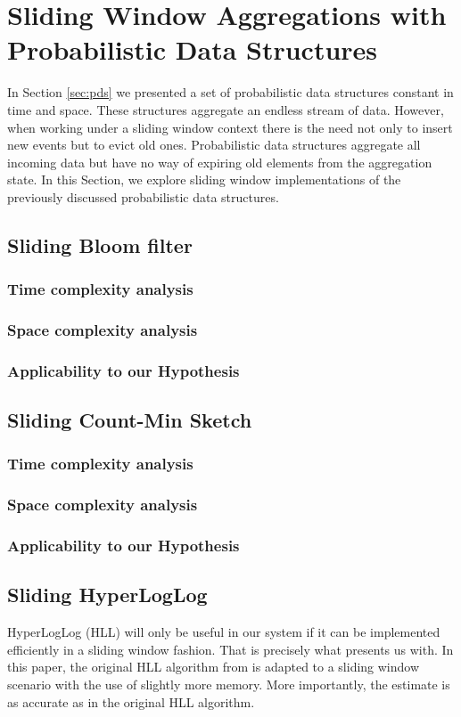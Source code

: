 \section{Sliding Window Aggregations with Probabilistic Data Structures}
In Section \ref{sec:pds} we presented a set of probabilistic data structures constant in time and space. These structures aggregate an endless stream of data. However, when working under a sliding window context there is the need not only to insert new events but to evict old ones. Probabilistic data structures aggregate all incoming data but have no way of expiring old elements from the aggregation state. In this Section, we explore sliding window implementations of the previously discussed probabilistic data structures.


\subsection{Sliding Bloom filter}
\subsubsection*{Time complexity analysis}
\subsubsection*{Space complexity analysis}
\subsubsection*{Applicability to our Hypothesis}


\subsection{Sliding Count-Min Sketch}
\subsubsection*{Time complexity analysis}
\subsubsection*{Space complexity analysis}
\subsubsection*{Applicability to our Hypothesis}


\subsection{Sliding HyperLogLog}
HyperLogLog  (HLL) will only be useful in our system if it can be implemented efficiently in a sliding window fashion. That is precisely what \cite{Chabchoub-Sliding-HLL} presents us with. In this paper, the original HLL algorithm from \cite{Flajolet-HLL} is adapted to a sliding window scenario with the use of slightly more memory. More importantly, the estimate is as accurate as in the original HLL algorithm. 

